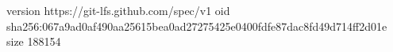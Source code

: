 version https://git-lfs.github.com/spec/v1
oid sha256:067a9ad0af490aa25615bea0ad27275425e0400fdfe87dac8fd49d714ff2d01e
size 188154
